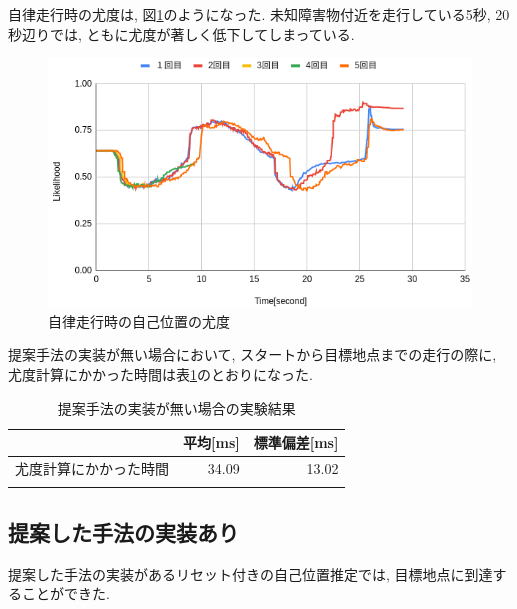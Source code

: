 自律走行時の尤度は, 図\ref{fig:nav_likelihood_no_imp}のようになった. 
未知障害物付近を走行している5秒, 20秒辺りでは, ともに尤度が著しく低下してしまっている. 

\begin{figure}[H]
  \begin{center}
    \includegraphics[width=0.98\linewidth]{figs/sim_likelihood_before.png}
    \caption{自律走行時の自己位置の尤度}
    \label{fig:nav_likelihood_no_imp}
  \end{center}
\end{figure}

提案手法の実装が無い場合において, スタートから目標地点までの走行の際に, 
尤度計算にかかった時間は表\ref{tabule:likelihood_calc_time_sim_no_imp}のとおりになった. 

\begin{table}[ht]
  \begin{center}
    \caption{提案手法の実装が無い場合の実験結果}
    \label{tabule:likelihood_calc_time_sim_no_imp}
    \begin{tabular}{l|r|r} 
      \thline
      & 平均[ms] &  標準偏差[ms] \\
      \hline
      尤度計算にかかった時間 & 34.09 & 13.02 \\
      \thline
    \end{tabular}
  \end{center}
\end{table}

\subsection{提案した手法の実装あり}

提案した手法の実装があるリセット付きの自己位置推定では, 目標地点に到達することができた. 

